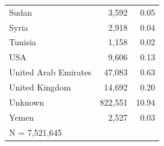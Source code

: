 \begin{tabular}{lrr}
Sudan               &       3,592&        0.05\\
Syria               &       2,918&        0.04\\
Tunisia             &       1,158&        0.02\\
USA                 &       9,606&        0.13\\
United Arab Emirates&      47,083&        0.63\\
United Kingdom      &      14,692&        0.20\\
Unknown             &     822,551&       10.94\\
Yemen               &       2,527&        0.03\\
\midrule


\multicolumn{3}{l}{\footnotesize N =    7,521,645}\\


\bottomrule


\end{tabular}


